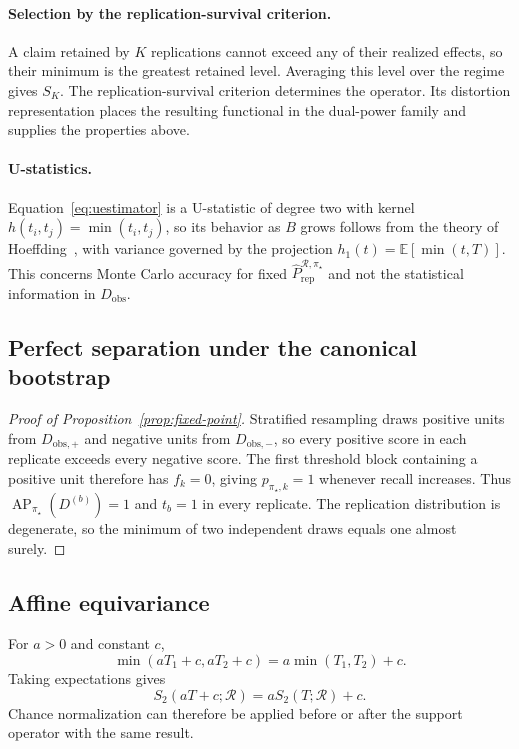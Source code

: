 \documentclass[11pt]{article}
\newcommand{\AP}{\operatorname{AP}}
\newcommand{\Regime}{\mathcal{R}}
\newcommand{\E}{\mathbb{E}}
\newcommand{\PRepHat}{\widehat{P}_{\mathrm{rep}}^{\Regime,\pi_\star}}
\theoremstyle{remark}
\begin{document}
\paragraph{Selection by the replication-survival criterion.}
A claim retained by $K$ replications cannot exceed any of their realized effects, so their minimum is the greatest retained level. Averaging this level over the regime gives $S_K$. The replication-survival criterion determines the operator. Its distortion representation places the resulting functional in the dual-power family and supplies the properties above.

\paragraph{U-statistics.}
Equation~\eqref{eq:uestimator} is a U-statistic of degree two with kernel $h(t_i,t_j)=\min(t_i,t_j)$, so its behavior as $B$ grows follows from the theory of Hoeffding~\cite{hoeffding1948ustat}, with variance governed by the projection $h_1(t)=\E[\min(t,T)]$. This concerns Monte Carlo accuracy for fixed $\PRepHat$ and not the statistical information in $D_{\mathrm{obs}}$.

\subsection{Perfect separation under the canonical bootstrap}
\label{app:fixed-point-proof}

\begin{proof}[Proof of Proposition~\ref{prop:fixed-point}]
Stratified resampling draws positive units from $D_{\mathrm{obs},+}$ and negative units from $D_{\mathrm{obs},-}$, so every positive score in each replicate exceeds every negative score. The first threshold block containing a positive unit therefore has $f_k=0$, giving $p_{\pi_\star,k}=1$ whenever recall increases. Thus $\AP_{\pi_\star}(D^{(b)})=1$ and $t_b=1$ in every replicate. The replication distribution is degenerate, so the minimum of two independent draws equals one almost surely.
\end{proof}

\subsection{Affine equivariance}
\label{app:affine-equivariance}

For $a>0$ and constant $c$,
\[
\min(aT_1+c,aT_2+c)
=
a\min(T_1,T_2)+c.
\]
Taking expectations gives
\[
S_2(aT+c;\Regime)=aS_2(T;\Regime)+c.
\]
Chance normalization can therefore be applied before or after the support operator with the same result.
\end{document}
